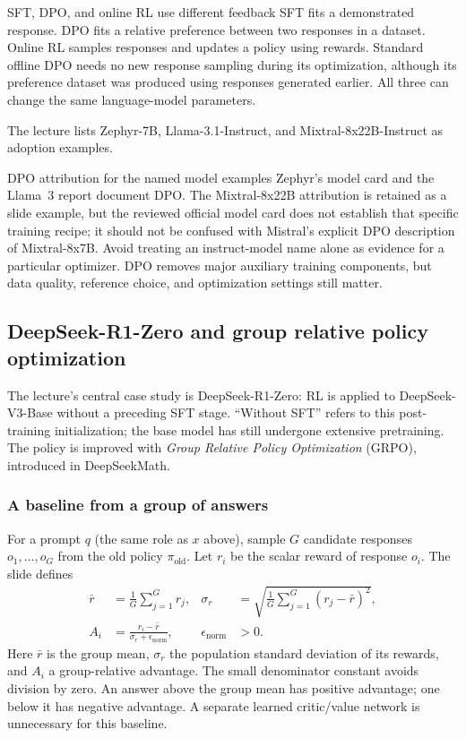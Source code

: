 \documentclass[11pt,a4paper]{article}
\numberwithin{equation}{section}
\numberwithin{figure}{section}
\numberwithin{table}{section}
\begin{document}
\begin{concept}{SFT, DPO, and online RL use different feedback}
SFT fits a demonstrated response. DPO fits a relative preference between two responses in a dataset. Online RL samples responses and updates a policy using rewards. Standard offline DPO needs no new response sampling during its optimization, although its preference dataset was produced using responses generated earlier. All three can change the same language-model parameters.
\end{concept}
The lecture lists Zephyr-7B, Llama-3.1-Instruct, and Mixtral-8x22B-Instruct as adoption examples.

\begin{supplementary}{DPO attribution for the named model examples}
Zephyr's model card and the Llama~3 report document DPO. The Mixtral-8x22B attribution is retained as a slide example, but the reviewed official model card does not establish that specific training recipe; it should not be confused with Mistral's explicit DPO description of Mixtral-8x7B. Avoid treating an instruct-model name alone as evidence for a particular optimizer. DPO removes major auxiliary training components, but data quality, reference choice, and optimization settings still matter.
\end{supplementary}

\subsection{DeepSeek-R1-Zero and group relative policy optimization}\label{sec:grpo}
The lecture's central case study is DeepSeek-R1-Zero: RL is applied to DeepSeek-V3-Base without a preceding SFT stage. ``Without SFT'' refers to this post-training initialization; the base model has still undergone extensive pretraining. The policy is improved with \emph{Group Relative Policy Optimization} (GRPO), introduced in DeepSeekMath.

\subsubsection{A baseline from a group of answers}
For a prompt $q$ (the same role as $x$ above), sample $G$ candidate responses $o_1,\ldots,o_G$ from the old policy $\pi_{\mathrm{old}}$. Let $r_i$ be the scalar reward of response $o_i$. The slide defines
\begin{align}
\bar r&=\frac1G\sum_{j=1}^G r_j,
&\sigma_r&=\sqrt{\frac1G\sum_{j=1}^G(r_j-\bar r)^2},\label{eq:groupstats}\\
A_i&=\frac{r_i-\bar r}{\sigma_r+\epsilon_{\mathrm{norm}}},
&\epsilon_{\mathrm{norm}}&>0.\label{eq:groupadvantage}
\end{align}
Here $\bar r$ is the group mean, $\sigma_r$ the population standard deviation of its rewards, and $A_i$ a group-relative advantage. The small denominator constant avoids division by zero. An answer above the group mean has positive advantage; one below it has negative advantage. A separate learned critic/value network is unnecessary for this baseline.
\end{document}
